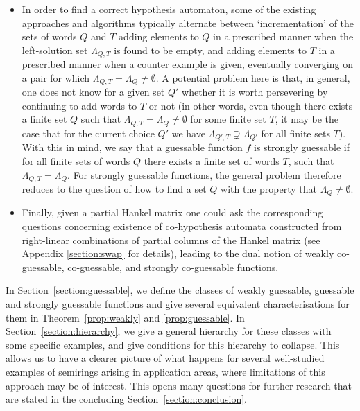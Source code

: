 \documentclass[10pt,a4paper]{amsart}
\theoremstyle{definition}
\numberwithin{equation}{section}
\numberwithin{theorem}{section}
\begin{document}
\begin{itemize}
is guaranteed to succeed on the 
class of guessable functions (since $\Lambda_{Q,T}=\Lambda_Q \neq \emptyset$ holds for at least one pair).
\item In order to find a correct hypothesis automaton, some of the existing approaches and algorithms typically alternate between `incrementation' of the sets of words $Q$ and $T$ adding elements to $Q$ in a prescribed manner when the left-solution set $\Lambda_{Q,T}$ is found to be empty, and adding elements to $T$ in a prescribed manner when a counter example is given, eventually converging on a pair for which $\Lambda_{Q, T} = \Lambda_Q \neq \emptyset$. A potential problem here is that, in general, one does not know for a given set $Q'$  whether it is worth persevering by continuing to add words to $T$ or not (in other words, even though there exists a finite set $Q$ such that $\Lambda_{Q,T} = \Lambda_Q \neq \emptyset$ for some finite set $T$, it may be the case that for the current choice $Q'$ we have $\Lambda_{Q', T} \supsetneq \Lambda_{Q'}$  for all finite sets $T$). With this in mind, we say that a guessable function $f$ is strongly guessable if for all finite sets of words $Q$ there exists a finite set of words $T$, such that $\Lambda_{Q,T}=\Lambda_Q$. For strongly guessable functions, the general problem therefore reduces to the question of how to find a set $Q$ with the property that $\Lambda_{Q} \neq \emptyset$.
\item Finally, given a partial Hankel matrix one could ask the corresponding questions concerning existence of co-hypothesis automata constructed from right-linear combinations of partial columns of the Hankel matrix (see Appendix \ref{section:swap} for details), leading to the dual notion of weakly co-guessable, co-guessable, and strongly co-guessable functions.
\end{itemize}
\noindent %
In Section~\ref{section:guessable}, we define the classes of weakly guessable, guessable and strongly guessable functions and give several equivalent characterisations for them in Theorem~\ref{prop:weakly} and \ref{prop:guessable}. In Section~\ref{section:hierarchy}, we give a general hierarchy for these classes with some specific  examples, and give conditions for this hierarchy to collapse. This allows us to have a clearer picture of what happens for several well-studied examples of semirings arising in application areas, where limitations of this approach may be of interest.  This opens many questions for further research that are stated in the concluding Section~\ref{section:conclusion}. 
\end{document}
